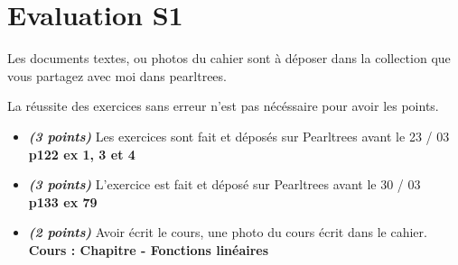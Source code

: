 \documentclass[11pt]{article}
\newcommand{\tempsexo}[1]{\textit{\textbf{(#1)}}}
\begin{document}
\newpage
\section{Evaluation S1 }

Les documents textes, ou photos du cahier sont à déposer dans la collection que vous partagez avec moi dans pearltrees.

La réussite des exercices sans erreur n'est pas nécéssaire pour avoir les points.

	\begin{itemize} 
	  \item \tempsexo{3 points} Les exercices sont fait et déposés sur Pearltrees avant le 23 / 03 \\	
    \textbf{p122 ex 1, 3 et 4}
	
	  \item \tempsexo{3 points} L'exercice est fait et déposé sur Pearltrees avant le 30 / 03 \\
	\textbf{p133 ex 79}

	  \item \tempsexo{2 points} Avoir écrit le cours, une photo du cours écrit dans le cahier.
		\textbf{Cours : Chapitre - Fonctions linéaires}
\end{itemize}	
\end{document}
